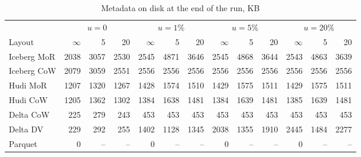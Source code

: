 \documentclass[conference]{IEEEtran}
\begin{document}
\begin{table}[!t]\centering
\caption{Metadata on disk at the end of the run, KB}\label{tab:a-meta}
\footnotesize
\begin{tabular}{@{}lrrrrrrrrrrrr@{}}\toprule
 & \multicolumn{3}{c}{$u=0$} & \multicolumn{3}{c}{$u=1\%$} & \multicolumn{3}{c}{$u=5\%$} & \multicolumn{3}{c}{$u=20\%$}\\
\cmidrule(lr){2-4}\cmidrule(lr){5-7}\cmidrule(lr){8-10}\cmidrule(lr){11-13}
Layout & $\infty$ & 5 & 20 & $\infty$ & 5 & 20 & $\infty$ & 5 & 20 & $\infty$ & 5 & 20\\\midrule
Iceberg MoR & 2038 & 3057 & 2530 & 2545 & 4871 & 3646 & 2545 & 4868 & 3644 & 2543 & 4863 & 3639\\
Iceberg CoW & 2079 & 3059 & 2551 & 2556 & 2556 & 2556 & 2556 & 2556 & 2556 & 2556 & 2556 & 2556\\
Hudi MoR & 1207 & 1320 & 1267 & 1428 & 1574 & 1510 & 1429 & 1575 & 1511 & 1429 & 1575 & 1511\\
Hudi CoW & 1205 & 1362 & 1302 & 1384 & 1638 & 1481 & 1384 & 1639 & 1481 & 1385 & 1639 & 1481\\
Delta CoW & 225 & 279 & 243 & 453 & 453 & 453 & 453 & 453 & 453 & 453 & 453 & 453\\
Delta DV & 229 & 292 & 255 & 1402 & 1128 & 1345 & 2038 & 1355 & 1910 & 2445 & 1484 & 2277\\
Parquet & 0 & -- & -- & 0 & -- & -- & 0 & -- & -- & 0 & -- & --\\\bottomrule
\end{tabular}
\end{table}
\end{document}
